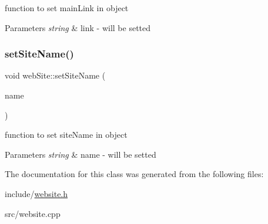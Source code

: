function to set main\+Link in object 


\begin{DoxyParams}{Parameters}
{\em string} & link -\/ will be setted \\
\hline
\end{DoxyParams}
\mbox{\label{classwebSite_aca75cc0b212650bd873fd2e7db1a2e2c}} 
\subsubsection{\texorpdfstring{set\+Site\+Name()}{setSiteName()}}
{\footnotesize\ttfamily void web\+Site\+::set\+Site\+Name (\begin{DoxyParamCaption}\item[{string}]{name }\end{DoxyParamCaption})}



function to set site\+Name in object 


\begin{DoxyParams}{Parameters}
{\em string} & name -\/ will be setted \\
\hline
\end{DoxyParams}


The documentation for this class was generated from the following files\+:\begin{DoxyCompactItemize}
\item 
include/\hyperlink{website_8h}{website.\+h}\item 
src/website.\+cpp\end{DoxyCompactItemize}
